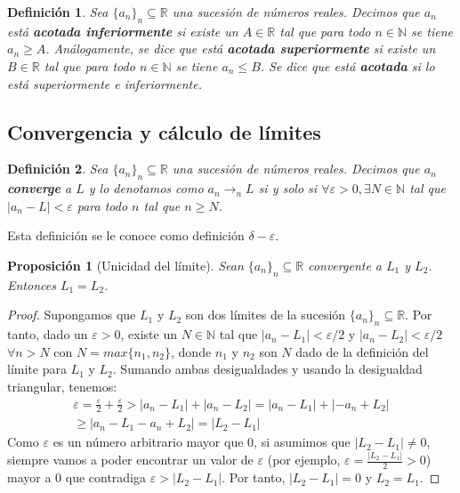 \documentclass{article}
\newtheorem{prop}{Proposición}
\newtheorem{define}{Definición}
\begin{document}
\begin{define}
	Sea $\{ a_n\}_n \subseteq \mathbb{R}$ una sucesión de números reales. Decimos que $a_n$ está \textbf{acotada inferiormente} si existe un $A \in \mathbb{R}$ tal que para todo $n \in \mathbb{N}$ se tiene $a_n \geq A$. Análogamente, se dice que está \textbf{acotada superiormente} si existe un $B \in \mathbb{R}$ tal que para todo $n \in \mathbb{N}$ se tiene $a_n \leq B$. Se dice que está \textbf{acotada} si lo está superiormente e inferiormente.
\end{define}

\subsection{Convergencia y cálculo de límites}

\begin{define}
	Sea $\{ a_n\}_n \subseteq \mathbb{R}$ una sucesión de números reales. Decimos que $a_n$ \textbf{converge} a $L$ y lo denotamos como $a_n \rightarrow_{n} L$ si y solo si 
	$\forall \varepsilon > 0,\exists N \in \mathbb{N}$ tal que $|a_n - L| < \varepsilon$ para todo $n$ tal que $n \geq N$.
\end{define}
Esta definición se le conoce como definición $\delta-\varepsilon$.

\begin{prop}[Unicidad del límite]
	Sean $\{ a_n\}_n \subseteq \mathbb{R}$ convergente a $L_1$ y $L_2$. Entonces $L_1 = L_2$.
\end{prop}
\begin{proof}
	Supongamos que $L_1$ y $L_2$ son dos límites de la sucesión $\{ a_n\}_n \subseteq \mathbb{R}$. Por tanto, dado un $\varepsilon > 0$, existe un $N \in \mathbb{N}$ 
	tal que $|a_n - L_1| < \varepsilon/2$ y $|a_n - L_2| < \varepsilon/2\ $ $\forall n > N$ con $N=max\{n_1, n_2\}$, donde $n_1$ y $n_2$ son $N$ dado de la definición del límite para 
	$L_1$ y $L_2$. Sumando ambas desigualdades y usando la desigualdad triangular, tenemos:
	\begin{align*}
		\varepsilon = \frac{\varepsilon}{2} + \frac{\varepsilon}{2} > |a_n - L_1| + |a_n - L_2| = |a_n - L_1| + |-a_n + L_2| \\ \geq |a_n - L_1 - a_n + L_2| = |L_2 - L_1|
	\end{align*}
	Como $\varepsilon$ es un número arbitrario mayor que 0, si asumimos que $|L_2 - L_1| \neq 0$, siempre vamos a poder encontrar un valor de $\varepsilon$ (por ejemplo, 
	$\varepsilon = \frac{|L_2 - L_1|}{2} > 0$) mayor a 0 que contradiga $\varepsilon > |L_2 - L_1|$. Por tanto, $|L_2 - L_1| = 0$ y $L_2 = L_1$.
\end{proof}
\end{document}
